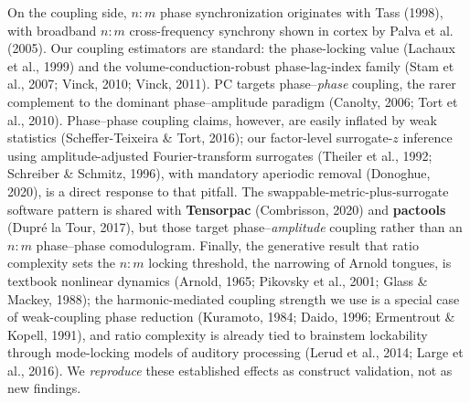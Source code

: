 \documentclass[11pt]{article}
\begin{document}
On the coupling side, $n{:}m$ phase synchronization originates with Tass (1998), with broadband $n{:}m$ cross-frequency synchrony shown in cortex by Palva et al. (2005). Our coupling estimators are standard: the phase-locking value (Lachaux et al., 1999) and the volume-conduction-robust phase-lag-index family (Stam et al., 2007; Vinck, 2010; Vinck, 2011). $\mathrm{PC}$ targets phase--\emph{phase} coupling, the rarer complement to the dominant phase--amplitude paradigm (Canolty, 2006; Tort et al., 2010). Phase--phase coupling claims, however, are easily inflated by weak statistics (Scheffer-Teixeira \& Tort, 2016); our factor-level surrogate-$z$ inference using amplitude-adjusted Fourier-transform surrogates (Theiler et al., 1992; Schreiber \& Schmitz, 1996), with mandatory aperiodic removal (Donoghue, 2020), is a direct response to that pitfall. The swappable-metric-plus-surrogate software pattern is shared with \textbf{Tensorpac} (Combrisson, 2020) and \textbf{pactools} (Dupré la Tour, 2017), but those target phase--\emph{amplitude} coupling rather than an $n{:}m$ phase--phase comodulogram. Finally, the generative result that ratio complexity sets the $n{:}m$ locking threshold, the narrowing of Arnold tongues, is textbook nonlinear dynamics (Arnold, 1965; Pikovsky et al., 2001; Glass \& Mackey, 1988); the harmonic-mediated coupling strength we use is a special case of weak-coupling phase reduction (Kuramoto, 1984; Daido, 1996; Ermentrout \& Kopell, 1991), and ratio complexity is already tied to brainstem lockability through mode-locking models of auditory processing (Lerud et al., 2014; Large et al., 2016). We \emph{reproduce} these established effects as construct validation, not as new findings.
\end{document}
